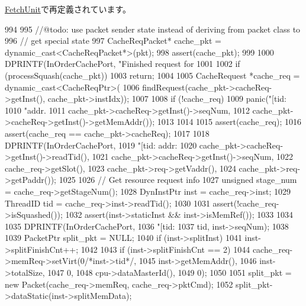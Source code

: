 \hyperlink{classFetchUnit_a3dc029c2e87eb911352b82ff15c86236}{FetchUnit}で再定義されています。


\begin{DoxyCode}
994 {
995     //@todo: use packet sender state instead of deriving from packet class to
996     //  get special state
997     CacheReqPacket* cache_pkt = dynamic_cast<CacheReqPacket*>(pkt);
998     assert(cache_pkt);
999 
1000     DPRINTF(InOrderCachePort, "Finished request for %
1001 
1002     if (processSquash(cache_pkt))
1003         return;
1004 
1005     CacheRequest *cache_req = dynamic_cast<CacheReqPtr>(
1006         findRequest(cache_pkt->cacheReq->getInst(), cache_pkt->instIdx));
1007 
1008     if (!cache_req) {
1009         panic("[tid:%
1010               "addr. %
1011               cache_pkt->cacheReq->getInst()->seqNum,
1012               cache_pkt->cacheReq->getInst()->getMemAddr());
1013     }
1014     
1015     assert(cache_req);
1016     assert(cache_req == cache_pkt->cacheReq);
1017 
1018     DPRINTF(InOrderCachePort,
1019             "[tid:%
      addr:%
1020             cache_pkt->cacheReq->getInst()->readTid(),
1021             cache_pkt->cacheReq->getInst()->seqNum,
1022             cache_req->getSlot(),
1023             cache_pkt->req->getVaddr(),
1024             cache_pkt->req->getPaddr());
1025 
1026     // Get resource request info
1027     unsigned stage_num = cache_req->getStageNum();
1028     DynInstPtr inst = cache_req->inst;
1029     ThreadID tid = cache_req->inst->readTid();
1030 
1031     assert(!cache_req->isSquashed());
1032     assert(inst->staticInst && inst->isMemRef());
1033 
1034 
1035     DPRINTF(InOrderCachePort,
1036             "[tid:%
1037             tid, inst->seqNum);
1038 
1039     PacketPtr split_pkt = NULL;
1040     if (inst->splitInst) {
1041         inst->splitFinishCnt++;
1042 
1043         if (inst->splitFinishCnt == 2) {
1044             cache_req->memReq->setVirt(0/*inst->tid*/,
1045                                        inst->getMemAddr(),
1046                                        inst->totalSize,
1047                                        0,
1048                                        cpu->dataMasterId(),
1049                                        0);
1050 
1051             split_pkt = new Packet(cache_req->memReq, cache_req->pktCmd);
1052             split_pkt->dataStatic(inst->splitMemData);
}}}
\end{DoxyCode}
